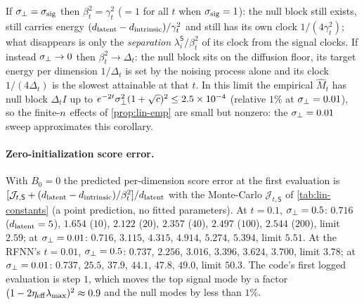\begin{remark}\label{rem:lin-iso}
If $\sigma_{\perp}=\sigma_{\mathrm{sig}}$ then $\beta_t^2=\gamma_t^2$ ($=1$ for all $t$ when $\sigma_{\mathrm{sig}}=1$): the null block still exists, still carries energy $(d_{\mathrm{latent}}-d_{\mathrm{intrinsic}})/\gamma_t^2$ and still has its own clock $1/(4\gamma_t^2)$; what disappears is only the \emph{separation} $\lambda^{\mathsf S}_i/\beta_t^2$ of its clock from the signal clocks. If instead $\sigma_{\perp}\to0$ then $\beta_t^2\to\Delta_t$: the null block sits on the diffusion floor, its target energy per dimension $1/\Delta_t$ is set by the noising process alone and its clock $1/(4\Delta_t)$ is the slowest attainable at that $t$. In this limit the empirical $\widehat M_t$ has null block $\Delta_tI$ up to $e^{-2t}\sigma_{\perp}^2(1+\sqrt c)^2\le2.5\times10^{-4}$ (relative $1\%$ at $\sigma_{\perp}=0.01$), so the finite-$n$ effects of \cref{prop:lin-emp} are small but nonzero: the $\sigma_{\perp}=0.01$ sweep approximates this corollary.
\end{remark}

\paragraph{Zero-initialization score error.}
With $B_0=0$ the predicted per-dimension score error at the first evaluation is $[\mathcal J_{t,\mathsf S}+(d_{\mathrm{latent}}-d_{\mathrm{intrinsic}})/\beta_t^2]/d_{\mathrm{latent}}$ with the Monte-Carlo $\mathcal J_{t,\mathsf S}$ of \cref{tab:lin-constants} (a point prediction, no fitted parameters). At $t=0.1$, $\sigma_{\perp}=0.5$: $0.716$ ($d_{\mathrm{latent}}=5$), $1.654$ ($10$), $2.122$ ($20$), $2.357$ ($40$), $2.497$ ($100$), $2.544$ ($200$), limit $2.59$; at $\sigma_{\perp}=0.01$: $0.716$, $3.115$, $4.315$, $4.914$, $5.274$, $5.394$, limit $5.51$. At the RFNN's $t=0.01$, $\sigma_{\perp}=0.5$: $0.737$, $2.256$, $3.016$, $3.396$, $3.624$, $3.700$, limit $3.78$; at $\sigma_{\perp}=0.01$: $0.737$, $25.5$, $37.9$, $44.1$, $47.8$, $49.0$, limit $50.3$. The code's first logged evaluation is step $1$, which moves the top signal mode by a factor $(1-2\eta_{\rm eff}\lambda_{\max})^2\approx0.9$ and the null modes by less than $1\%$.

